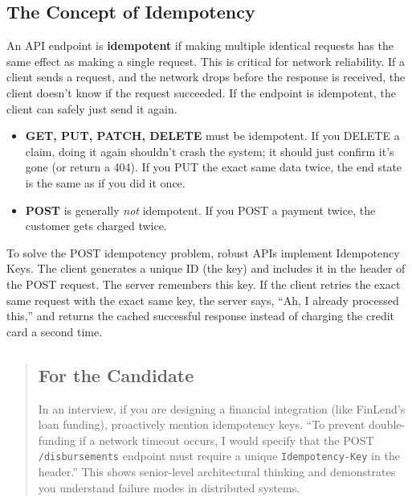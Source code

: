 \subsection{The Concept of
Idempotency}\label{the-concept-of-idempotency}

An API endpoint is \textbf{idempotent} if making multiple identical
requests has the same effect as making a single request. This is
critical for network reliability. If a client sends a request, and the
network drops before the response is received, the client doesn't know
if the request succeeded. If the endpoint is idempotent, the client can
safely just send it again.

\begin{itemize}
\tightlist
\item
  \textbf{GET, PUT, PATCH, DELETE} must be idempotent. If you DELETE a
  claim, doing it again shouldn't crash the system; it should just
  confirm it's gone (or return a 404). If you PUT the exact same data
  twice, the end state is the same as if you did it once.
\item
  \textbf{POST} is generally \emph{not} idempotent. If you POST a
  payment twice, the customer gets charged twice.
\end{itemize}

To solve the POST idempotency problem, robust APIs implement Idempotency
Keys. The client generates a unique ID (the key) and includes it in the
header of the POST request. The server remembers this key. If the client
retries the exact same request with the exact same key, the server says,
``Ah, I already processed this,'' and returns the cached successful
response instead of charging the credit card a second time.

\begin{quote}
\subsection{For the Candidate}\label{for-the-candidate}

In an interview, if you are designing a financial integration (like
FinLend's loan funding), proactively mention idempotency keys. ``To
prevent double-funding if a network timeout occurs, I would specify that
the POST \texttt{/disbursements} endpoint must require a unique
\texttt{Idempotency-Key} in the header.'' This shows senior-level
architectural thinking and demonstrates you understand failure modes in
distributed systems.
\end{quote}

